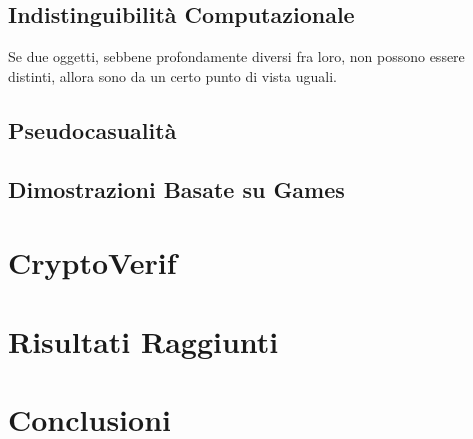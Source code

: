\documentclass[a4paper,openright,twoside,12pt]{report}
\begin{document}
\section{Indistinguibilit\`a Computazionale}
Se due oggetti, sebbene profondamente diversi fra loro, non possono essere distinti, allora sono da un certo punto di vista uguali.

\section{Pseudocasualit\`a}

\section{Dimostrazioni Basate su Games}

\chapter{CryptoVerif}

\chapter{Risultati Raggiunti}

\chapter{Conclusioni}
\lhead[\fancyplain{}{\bfseries\thepage}]{\fancyplain{}{\bfseries\rightmark}}
	
		
\end{document}
